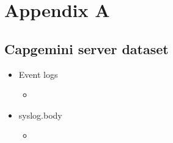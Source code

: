 \chapter{Appendix A} \label{ch:appendices}

\section{Capgemini server dataset}

\begin{itemize}
  \item Event logs 
  \begin{itemize}
      \item 
  \end{itemize}
  \item syslog.body
  \begin{itemize}
      \item 
  \end{itemize}
\end{itemize}

